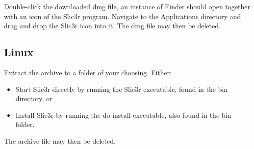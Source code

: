 Double-click the downloaded dmg file, an instance of Finder should open together with an icon of the Slic3r program.  Navigate to the Applications directory and drag and drop the Slic3r icon into it.
The dmg file may then be deleted.

\subsection{Linux}

Extract the archive to a folder of your choosing.
Either:
\begin{itemize}
\item Start Slic3r directly by running the Slic3r executable, found in the bin directory, or
\item Install Slic3r by running the do-install executable, also found in the bin folder.
\end{itemize}
The archive file may then be deleted.